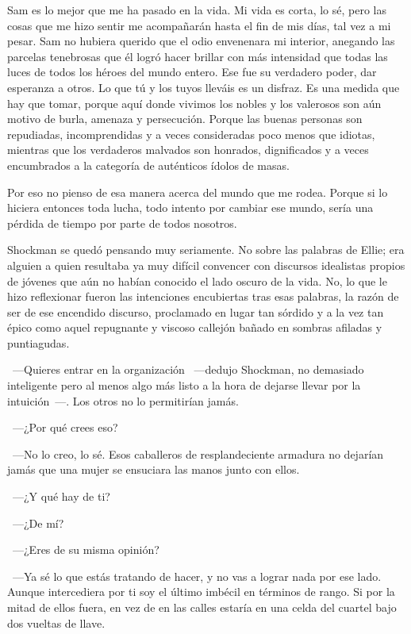 \rquoti Sam es lo mejor que me ha pasado en la vida. Mi vida es corta, lo sé, pero las cosas que me hizo sentir me acompañarán hasta el fin de mis días, tal vez a mi pesar. Sam no hubiera querido que el odio envenenara mi interior, anegando las parcelas tenebrosas que él logró hacer brillar con más intensidad que todas las luces de todos los héroes del mundo entero. Ese fue su verdadero poder, dar esperanza a otros. Lo que tú y los tuyos lleváis es un disfraz. Es una medida que hay que tomar, porque aquí donde vivimos los nobles y los valerosos son aún motivo de burla, amenaza y persecución. Porque las buenas personas son repudiadas, incomprendidas y a veces consideradas poco menos que idiotas, mientras que los verdaderos malvados son honrados, dignificados y a veces encumbrados a la categoría de auténticos ídolos de masas.


\rquoti Por eso no pienso de esa manera acerca del mundo que me rodea. Porque si lo hiciera entonces toda lucha, todo intento por cambiar ese mundo, sería una pérdida de tiempo por parte de todos nosotros.

Shockman se quedó pensando muy seriamente. No sobre las palabras de Ellie; era alguien a quien resultaba ya muy difícil convencer con discursos idealistas propios de jóvenes que aún no habían conocido el lado oscuro de la vida. No, lo que le hizo reflexionar fueron las intenciones encubiertas tras esas palabras, la razón de ser de ese encendido discurso, proclamado en lugar tan sórdido y a la vez tan épico como aquel repugnante y viscoso callejón bañado en sombras afiladas y puntiagudas.

~---Quieres entrar en la organización ~---dedujo Shockman, no demasiado inteligente pero al menos algo más listo a la hora de dejarse llevar por la intuición~---. Los otros no lo permitirían jamás.

~---¿Por qué crees eso?

~---No lo creo, lo sé. Esos caballeros de resplandeciente armadura no dejarían jamás que una mujer se ensuciara las manos junto con ellos.

~---¿Y qué hay de ti?

~---¿De mí?

~---¿Eres de su misma opinión?

~---Ya sé lo que estás tratando de hacer, y no vas a lograr nada por ese lado. Aunque intercediera por ti soy el último imbécil en términos de rango. Si por la mitad de ellos fuera, en vez de en las calles estaría en una celda del cuartel bajo dos vueltas de llave.


